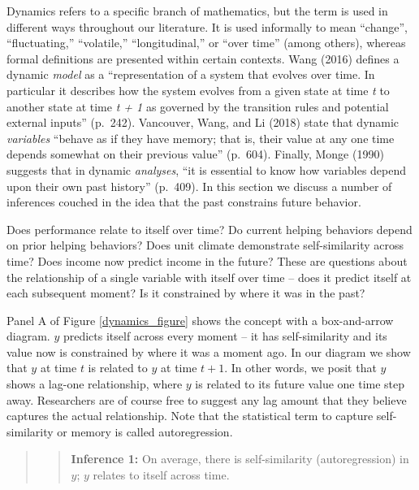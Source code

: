 \documentclass[english,,man]{apa6}
\theoremstyle{definition}
\theoremstyle{definition}
\theoremstyle{definition}
\theoremstyle{remark}
\begin{document}
Dynamics refers to a specific branch of mathematics, but the term is
used in different ways throughout our literature. It is used informally
to mean \enquote{change}, \enquote{fluctuating,} \enquote{volatile,}
\enquote{longitudinal,} or \enquote{over time} (among others), whereas
formal definitions are presented within certain contexts. Wang (2016)
defines a dynamic \emph{model} as a \enquote{representation of a system
that evolves over time. In particular it describes how the system
evolves from a given state at time \emph{t} to another state at time
\emph{t + 1} as governed by the transition rules and potential external
inputs} (p.~242). Vancouver, Wang, and Li (2018) state that dynamic
\emph{variables} \enquote{behave as if they have memory; that is, their
value at any one time depends somewhat on their previous value}
(p.~604). Finally, Monge (1990) suggests that in dynamic
\emph{analyses}, \enquote{it is essential to know how variables depend
upon their own past history} (p.~409). In this section we discuss a
number of inferences couched in the idea that the past constrains future
behavior.

Does performance relate to itself over time? Do current helping
behaviors depend on prior helping behaviors? Does unit climate
demonstrate self-similarity across time? Does income now predict income
in the future? These are questions about the relationship of a single
variable with itself over time -- does it predict itself at each
subsequent moment? Is it constrained by where it was in the past?

Panel A of Figure \ref{dynamics_figure} shows the concept with a
box-and-arrow diagram. \(y\) predicts itself across every moment -- it
has self-similarity and its value now is constrained by where it was a
moment ago. In our diagram we show that \(y\) at time \(t\) is related
to \(y\) at time \(t + 1\). In other words, we posit that \(y\) shows a
lag-one relationship, where \(y\) is related to its future value one
time step away. Researchers are of course free to suggest any lag amount
that they believe captures the actual relationship. Note that the
statistical term to capture self-similarity or memory is called
autoregression.

\begin{quote}
\begin{quote}
\textbf{Inference 1:} On average, there is self-similarity
(autoregression) in \(y\); \(y\) relates to itself across time.
\end{quote}
\end{quote}
\end{document}
